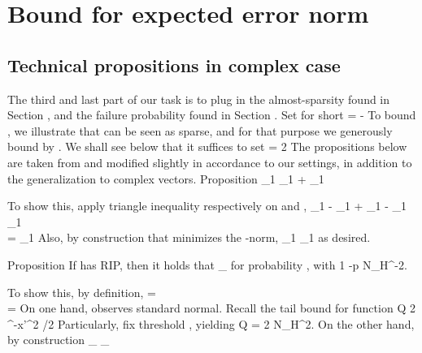 \section {Bound for expected error norm}

\subsection {Technical propositions in complex case}

The third and last part of our task is to plug in the almost-sparsity found in Section , and the failure probability found in Section .
Set for short
%
 {
=  -  
}
%
To bound , we illustrate that  can be seen as sparse, and for that purpose we generously bound  by .
We shall see below that it suffices to set
%
 {
\g
= 2  
}
%
The propositions below are taken from \cite {CaT07} and modified slightly in accordance to our settings, in addition to the generalization to complex vectors.
%
\Result
{Proposition}
{
%
 {
 _1
\leq {} _1
+ _1 
}
}

To show this, apply triangle inequality respectively on  and ,
%
 {
 _1
-  _1
+  _1
-  _1
\leq {} _1 \\
%
= _1 
}
%
Also, by construction that  minimizes the -norm,
%
 {
 _1
\leq {} _1 
}
as desired.

%
\Result
{Proposition}
{
If  has  RIP, then it holds that
%
 {
 _\infty
{}  
}
%
for probability , with
%
 {
1 -p
\leq N_H^{-2}. 
}
}

To show this, by definition,
%
 {
=  \\
%
=  
}
%
On one hand,  observes standard normal.
Recall the tail bound for  function
%
 {
Q
\leq {} {2} ^{-x'^2 /2} 
}
%
Particularly, fix threshold , yielding
%
 {
Q
= {2 N_H^2}. 
}
%
On the other hand, by construction
%
 {
 _\infty
\leq {} _\infty \\
%
}

